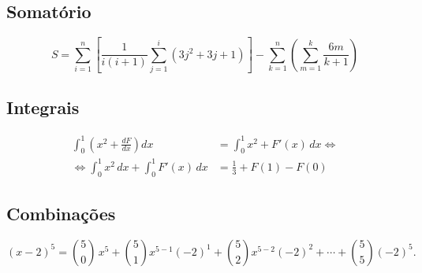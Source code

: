 \documentclass[11pt,a4paper]{report}
\begin{document}
\subsection{Somatório}
$$
S = \sum_{i=1}^{n} \left[\frac{1}{i(i+1)}\sum_{j=1}^{i}(3j^2 + 3j + 1) \right] - \sum_{k=1}^{n} \left(\sum_{m=1}^{k}\dfrac{6m}{k+1}\right)$$

\subsection{Integrais}
\begin{align}
\int_{0}^{1}\left(x^2 + \frac{dF}{dx}\right) dx 
&= \int_{0}^{1} x^2 + F'(x)\,dx \Leftrightarrow \\
\Leftrightarrow \int_{0}^{1} x^2 \, dx + \int_{0}^{1} F'(x)\,dx
&= \frac{1}{3} + F(1) - F(0)
\end{align}

\subsection{Combinações}
$$(x-2)^5= \binom{5}{0}\,x^5+\binom{5}{1}x^{5-1}(-2)^1+\binom{5}{2}x^{5-2}(-2)^2+\cdots+\binom{5}{5}(-2)^5.$$
\end{document}
